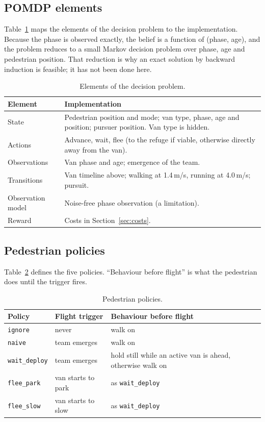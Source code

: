 \documentclass[11pt,a4paper]{article}
\begin{document}
\subsection{POMDP elements}
Table~\ref{tab:pomdp} maps the elements of the decision problem to the implementation. Because the phase is observed exactly, the belief is a function of (phase, age), and the problem reduces to a small Markov decision problem over phase, age and pedestrian position. That reduction is why an exact solution by backward induction is feasible; it has not been done here.

\begin{table}[htbp]
\centering
\caption{Elements of the decision problem.}\label{tab:pomdp}
\small
\begin{tabular}{p{2.6cm}p{11.6cm}}
\toprule
\textbf{Element} & \textbf{Implementation} \\
\midrule
State & Pedestrian position and mode; van type, phase, age and position; pursuer position. Van type is hidden. \\
Actions & Advance, wait, flee (to the refuge if viable, otherwise directly away from the van). \\
Observations & Van phase and age; emergence of the team. \\
Transitions & Van timeline above; walking at 1.4\,m/s, running at 4.0\,m/s; pursuit. \\
Observation model & Noise-free phase observation (a limitation). \\
Reward & Costs in Section~\ref{sec:costs}. \\
\bottomrule
\end{tabular}
\end{table}

\subsection{Pedestrian policies}
Table~\ref{tab:policies} defines the five policies. ``Behaviour before flight'' is what the pedestrian does until the trigger fires.

\begin{table}[htbp]
\centering
\caption{Pedestrian policies.}\label{tab:policies}
\small
\begin{tabular}{llp{6.6cm}}
\toprule
\textbf{Policy} & \textbf{Flight trigger} & \textbf{Behaviour before flight} \\
\midrule
\texttt{ignore} & never & walk on \\
\texttt{naive} & team emerges & walk on \\
\texttt{wait\_deploy} & team emerges & hold still while an active van is ahead, otherwise walk on \\
\texttt{flee\_park} & van starts to park & as \texttt{wait\_deploy} \\
\texttt{flee\_slow} & van starts to slow & as \texttt{wait\_deploy} \\
\bottomrule
\end{tabular}
\end{table}
\end{document}
